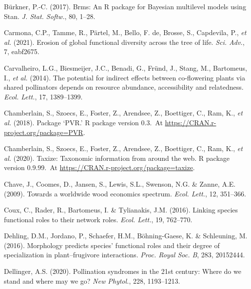 \documentclass[
  12pt,
  a4paper,
]{article}
\newlength{\cslhangindent}
\newlength{\cslentryspacingunit} %
\newenvironment{CSLReferences}[2] %
 {%
  \setlength{\parindent}{0pt}
  \ifodd #1
  \let\oldpar\par
  \def\par{\hangindent=\cslhangindent\oldpar}
  \fi
  \setlength{\parskip}{#2\cslentryspacingunit}
 }%
 {}
\begin{document}
\begin{CSLReferences}{1}{0}
\leavevmode{}%
Bürkner, P.-C. (2017). Brms: {An R} package for {Bayesian} multilevel models using {Stan}. \emph{J. Stat. Softw.}, 80, 1--28.

\leavevmode{}%
Carmona, C.P., Tamme, R., Pärtel, M., Bello, F. de, Brosse, S., Capdevila, P., \emph{et al.} (2021). Erosion of global functional diversity across the tree of life. \emph{Sci. Adv.}, 7, eabf2675.

\leavevmode{}%
Carvalheiro, L.G., Biesmeijer, J.C., Benadi, G., Fründ, J., Stang, M., Bartomeus, I., \emph{et al.} (2014). The potential for indirect effects between co-flowering plants via shared pollinators depends on resource abundance, accessibility and relatedness. \emph{Ecol. Lett.}, 17, 1389--1399.

\leavevmode{}%
Chamberlain, S., Szoecs, E., Foster, Z., Arendsee, Z., Boettiger, C., Ram, K., \emph{et al.} (2018). Package {`{PVR}.'} R package version 0.3.~At \href{https://CRAN.R-project.org/package=PVR}{https://CRAN.r-project.org/package=PVR}.

\leavevmode{}%
Chamberlain, S., Szoecs, E., Foster, Z., Arendsee, Z., Boettiger, C., Ram, K., \emph{et al.} (2020). Taxize: {Taxonomic} information from around the web. R package version 0.9.99.~At \href{https://CRAN.R-project.org/package=taxize}{https://CRAN.r-project.org/package=taxize}.

\leavevmode{}%
Chave, J., Coomes, D., Jansen, S., Lewis, S.L., Swenson, N.G. \& Zanne, A.E. (2009). Towards a worldwide wood economics spectrum. \emph{Ecol. Lett.}, 12, 351--366.

\leavevmode{}%
Coux, C., Rader, R., Bartomeus, I. \& Tylianakis, J.M. (2016). Linking species functional roles to their network roles. \emph{Ecol. Lett.}, 19, 762--770.

\leavevmode{}%
Dehling, D.M., Jordano, P., Schaefer, H.M., Böhning-Gaese, K. \& Schleuning, M. (2016). Morphology predicts species' functional roles and their degree of specialization in plant--frugivore interactions. \emph{Proc. Royal Soc. B}, 283, 20152444.

\leavevmode{}%
Dellinger, A.S. (2020). Pollination syndromes in the 21st century: Where do we stand and where may we go? \emph{New Phytol.}, 228, 1193--1213.


\end{CSLReferences}
\end{document}
